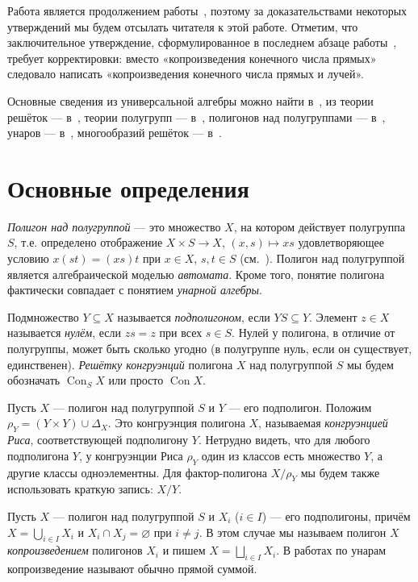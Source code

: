 \documentclass[11pt,twoside,final
]{article}
\def\Con{\operatorname{Con}}
\begin{document}
Работа является продолжением работы~\cite{Kozhukhov_8}, поэтому за доказательствами некоторых утверждений мы будем отсылать читателя к этой работе.
Отметим, что заключительное утверждение, сформулированное в последнем абзаце работы~\cite{Kozhukhov_8}, требует корректировки: вместо «копроизведения конечного числа прямых» следовало написать «копроизведения конечного числа прямых и лучей».

Основные сведения из универсальной алгебры можно найти в~\cite{Kohn_9}, из теории решёток — в~\cite{Gretzer_10}, теории полугрупп — в~\cite{Clifford_11}, полигонов над полугруппами — в~\cite{Kilp_1}, унаров — в~\cite{Jakubikova_12}, многообразий решёток — в~\cite{Jipsen_13}.

\section{Основные определения}

\textit{Полигон над полугруппой} — это множество $X$, на котором действует полугруппа $S$, т.е. определено отображение $X \times S \to X$, $(x,s) \mapsto xs$ удовлетворяющее условию $x(st) = (xs)t$ при $x \in X$, $s,t \in S$ (см.~\cite{Kilp_1}).
Полигон над полугруппой является алгебраической моделью \textit{автомата}.
Кроме того, понятие полигона фактически совпадает с понятием \textit{унарной алгебры}.

Подмножество $Y \subseteq X$ называется \textit{подполигоном}, если $YS \subseteq Y$.
Элемент $z \in X$ называется \textit{нулём}, если $zs = z$ при всех $s \in S$.
Нулей у полигона, в отличие от полугруппы, может быть сколько угодно (в полугруппе нуль, если он существует, единственен).
\textit{Решётку конгруэнций} полигона $X$ над полугруппой $S$ мы будем обозначать $\Con_S X$ или просто $\Con X$.

Пусть $X$ — полигон над полугруппой $S$ и $Y$ — его подполигон.
Положим $ \rho_Y = (Y \times Y) \cup \Delta_X $.
Это конгруэнция полигона $X$, называемая \textit{конгруэнцией Риса}, соответствующей подполигону $Y$.
Нетрудно видеть, что для любого подполигона $Y$, у конгруэнции Риса $\rho_Y$ один из классов есть множество $Y$, а другие классы одноэлементны.
Для фактор-полигона $X/\rho_Y$ мы будем также использовать краткую запись: $X/Y$.

Пусть $X$ — полигон над полугруппой $S$ и $X_i$ ($i \in I$) — его подполигоны, причём $X = \bigcup_{i \in I} X_{i}$ и $X_{i} \cap X_{j} = \varnothing$ при $i \neq j$.
В этом случае мы называем полигон $X$ \textit{копроизведением} полигонов $X_i$ и пишем $X = \bigsqcup_{i \in I} X_{i}$.
В работах по унарам копроизведение называют обычно прямой суммой.
\end{document}
